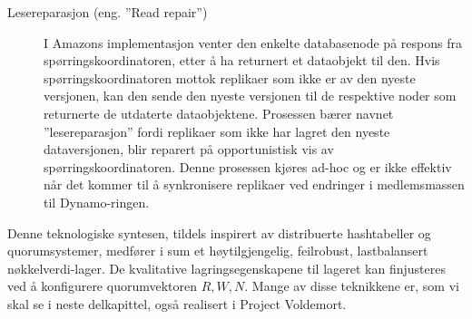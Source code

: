 \begin{description}
  \item [Lesereparasjon (eng. ''Read repair'')] I Amazons implementasjon venter den enkelte databasenode på respons fra spørringskoordinatoren, etter å ha returnert et dataobjekt til den. Hvis spørringskoordinatoren mottok replikaer som ikke er av den nyeste versjonen, kan den sende den nyeste versjonen til de respektive noder som returnerte de utdaterte dataobjektene. Prosessen bærer navnet ''lesereparasjon'' fordi replikaer som ikke har lagret den nyeste dataversjonen, blir reparert på opportunistisk vis av spørringskoordinatoren. Denne prosessen kjøres ad-hoc og er ikke effektiv når det kommer til å synkronisere replikaer ved endringer i medlemsmassen til Dynamo-ringen. %
\end{description}

Denne teknologiske syntesen, tildels inspirert av distribuerte hashtabeller og quorumsystemer, medfører i sum et høytilgjengelig, feilrobust, lastbalansert nøkkelverdi-lager. De kvalitative lagringsegenskapene til lageret kan finjusteres ved å konfigurere quorumvektoren \(R, W, N\). Mange av disse teknikkene er, som vi skal se i neste delkapittel, også realisert i Project Voldemort.

